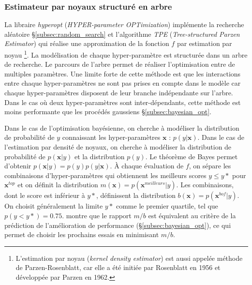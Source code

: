 \subsubsection{Estimateur par noyaux structuré en arbre} \label{subsubsec:tpe_opt}
La libraire \textit{hyperopt} \cite{bergstra_making_2013} (\textit{HYPER-parameter OPTimization}) implémente la recherche aléatoire §\ref{subsec:random_search} et l'algorithme \textit{TPE} (\textit{Tree-structured Parzen Estimator}) \cite{bergstra_algorithms_2011} qui réalise une approximation de la fonction $f$ par estimation par noyau \footnote{L'estimation par noyau (\textit{kernel density estimator}) est aussi appelée méthode de Parzen-Rosenblatt, car elle a été initiée par Rosenblatt en 1956 et développée par Parzen en 1962.}.
La modélisation de chaque hyper-paramètre est structurée dans un arbre de recherche.
Le parcours de l'arbre permet de réaliser l'optimisation entre de multiples paramètres.
Une limite forte de cette méthode est que les interactions entre chaque hyper-paramètres ne sont pas prises en compte dans le modèle car chaque hyper-paramètres disposent de leur branche indépendante sur l'arbre.
Dans le cas où deux hyper-paramètres sont inter-dépendants, cette méthode est moins performante que les procédés gaussiens §\ref{subsec:bayesian_opt}.

Dans le cas de l'optimisation bayésienne, on cherche à modéliser la distribution de probabilité de $y$ connaissant les hyper-paramètres $\boldsymbol{x}$ : $p(y | \boldsymbol{x})$.
Dans le cas de l'estimation par densité de noyaux, on cherche à modéliser la distribution de probabilité de $p(\boldsymbol{x} | y)$ et la distribution $p(y)$.
Le théorème de Bayes permet d'obtenir $p(\boldsymbol{x} | y) = p(y) p(y | \boldsymbol{x})$.
À chaque évaluation de $f$, on sépare les combinaisons d'hyper-paramètres qui obtiennent les meilleurs scores $y \le y*$ pour $\boldsymbol{x}^{top}$ et on définit la distribution $m(\boldsymbol{x})=p(\boldsymbol{x}^{meilleurs} | y)$.
Les combinaisons, dont le score est inférieur à $y*$, définissent la distribution $b(\boldsymbol{x})=p(\boldsymbol{x}^{bof} | y)$.
On choisit généralement la limite $y*$ comme le premier quartile, tel que $p(y < y*) = 0.75$.
\cite{bergstra_algorithms_2011} montre que le rapport $m/b$ est équivalent au critère de la prédiction de l'amélioration de performance (§\ref{subsec:bayesian_opt}), ce qui permet de choisir les prochains essais en minimisant $m/b$.

